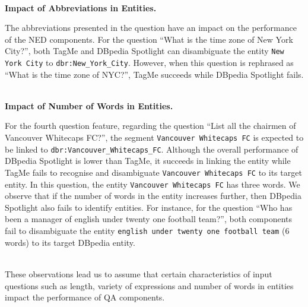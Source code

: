 \documentclass[sigconf,edbt]{acmart-edbt2019}
\newcommand{\qq}[1]{``#1''}
\newcommand{\jlt}[1]{\todo[inline, color=cyan]{JL: #1}}
\begin{document}
~\\
{\bf Impact of Abbreviations in Entities.} \begin{inparaenum}
The abbreviations presented in the question have an impact on the performance of the NED components. For the question \qq{What is the time zone of New York City?}, both TagMe and DBpedia Spotlight can disambiguate the entity \texttt{New York City} to \texttt{dbr:New\_York\_City}. However, when this question is rephrased as \qq{What is the time zone of NYC?}, TagMe succeeds while DBpedia Spotlight fails.
\end{inparaenum}
~\\
{\bf Impact of Number of Words in Entities.} \begin{inparaenum}
For the fourth question feature, regarding the question \qq{List all the chairmen of Vancouver Whitecaps FC?}, the segment \texttt{Vancouver Whitecaps FC} is expected to be linked to \texttt{dbr:Vancouver\_Whitecaps\_FC}.
Although the overall performance of DBpedia Spotlight is lower than TagMe, it succeeds in linking the entity while TagMe fails to recognise and disambiguate \texttt{Vancouver Whitecaps FC} to its target entity. 
In this question, the entity \texttt{Vancouver Whitecaps FC} has three words. We observe that if the number of words in the entity increases further, then DBpedia Spotlight also fails to identify entities. For instance, for the question \qq{Who has been a manager of english under twenty one football team?}, both components fail to disambiguate the entity \texttt{english under twenty one football team} (6 words) to its target DBpedia entity. 
\end{inparaenum}
~\\
These observations lead us to assume that certain characteristics of input questions such as length, variety of expressions and number of words in entities impact the performance of QA components.
\end{document}
